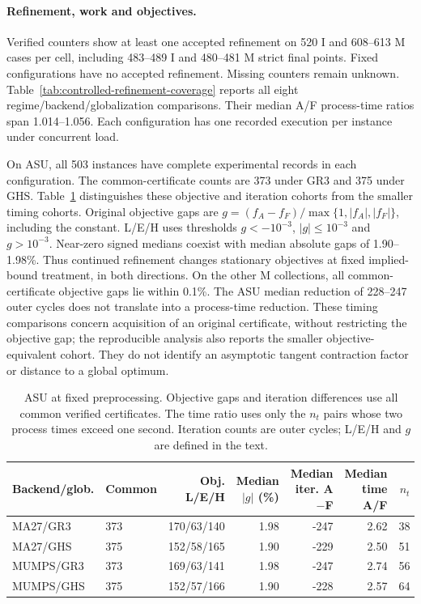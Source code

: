 \documentclass[pdflatex,sn-mathphys-num]{sn-jnl}
\theoremstyle{thmstyleone}
\theoremstyle{thmstylethree}
\begin{document}
\paragraph{Refinement, work and objectives.}
Verified counters show at least one accepted refinement on 520 I
and 608--613 M cases per cell, including 483--489 I and 480--481 M strict
final points. Fixed configurations have no accepted refinement. Missing counters remain
unknown. Table~\ref{tab:controlled-refinement-coverage} reports all eight
regime/backend/globalization comparisons. Their median A/F process-time
ratios span 1.014--1.056. Each configuration has one recorded execution
per instance under concurrent load.

On ASU, all 503 instances have complete experimental records in each configuration.
The common-certificate counts are 373 under GR3 and 375 under GHS.
Table~\ref{tab:controlled-refinement-asu} distinguishes these objective and
iteration cohorts from the smaller timing cohorts. Original objective
gaps are $g=(f_A-f_F)/\max\{1,|f_A|,|f_F|\}$, including the constant.
L/E/H uses thresholds $g<-10^{-3}$, $|g|\leq10^{-3}$ and $g>10^{-3}$.
Near-zero signed medians coexist with median absolute gaps of
1.90--1.98\%. Thus continued refinement changes stationary objectives
at fixed implied-bound treatment, in both directions. On the other M
collections, all common-certificate objective gaps lie within 0.1\%.
The ASU median reduction of 228--247 outer cycles does not translate into
a process-time reduction. These timing comparisons concern acquisition of
an original certificate, without restricting the objective gap; the
reproducible analysis also reports the smaller objective-equivalent cohort.
They do not identify an asymptotic tangent contraction factor or distance
to a global optimum.

\begin{table}[!htbp]
\centering\footnotesize\setlength{\tabcolsep}{3pt}
\caption{ASU at fixed preprocessing. Objective gaps and iteration differences
use all common verified certificates. The time ratio uses only the
$n_t$ pairs whose two process times exceed one second. Iteration counts
are outer cycles; L/E/H and $g$ are defined in the text.}
\label{tab:controlled-refinement-asu}
\begin{tabular}{@{}llrrrrr@{}}
\toprule
Backend/glob. & Common & Obj. L/E/H & \shortstack{Median\\$|g|$ (\%)} & \shortstack{Median\\iter. A$-$F} & \shortstack{Median\\time A/F} & $n_t$\\
\midrule
MA27/GR3 & 373 & 170/63/140 & 1.98 & -247 & 2.62 & 38\\
MA27/GHS & 375 & 152/58/165 & 1.90 & -229 & 2.50 & 51\\
MUMPS/GR3 & 373 & 169/63/141 & 1.98 & -247 & 2.74 & 56\\
MUMPS/GHS & 375 & 152/57/166 & 1.90 & -228 & 2.57 & 64\\
\bottomrule
\end{tabular}

\end{table}
\end{document}
